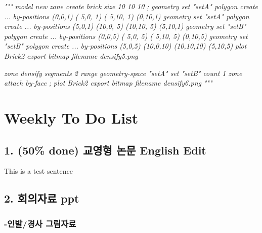 \documentclass[a4paper, nobind]{templates/ociamthesis}
\newenvironment{Shaded}{\begin{snugshade}}{\end{snugshade}}
\newcommand{\CommentTok}[1]{\textcolor[rgb]{0.56,0.35,0.01}{\textit{#1}}}
\renewenvironment{Shaded}
{
  \vspace{10pt}%
  \begin{snugshade}%
}{%
  \end{snugshade}%
  \vspace{8pt}%
}
\begin{document}
\begin{Shaded}
\begin{Highlighting}[]
\CommentTok{"""}
\CommentTok{model new}
\CommentTok{zone create brick size 10 10 10}
\CommentTok{;}
\CommentTok{geometry set "setA" polygon create ...}
\CommentTok{                    by{-}positions (0,0,1) ( 5,0, 1) ( 5,10, 1) (0,10,1)}
\CommentTok{geometry set "setA" polygon create ...}
\CommentTok{                    by{-}positions (5,0,1) (10,0, 5) (10,10, 5) (5,10,1)}
\CommentTok{geometry set "setB" polygon create ...}
\CommentTok{                    by{-}positions (0,0,5) ( 5,0, 5) ( 5,10, 5) (0,10,5)}
\CommentTok{geometry set "setB" polygon create ...}
\CommentTok{                    by{-}positions (5,0,5) (10,0,10) (10,10,10) (5,10,5)}
\CommentTok{plot \textquotesingle{}Brick2\textquotesingle{} export bitmap filename \textquotesingle{}densify5.png\textquotesingle{}}

\CommentTok{zone densify segments 2 range geometry{-}space "setA" set "setB" count 1}
\CommentTok{zone attach by{-}face}
\CommentTok{;}
\CommentTok{plot \textquotesingle{}Brick2\textquotesingle{} export bitmap filename \textquotesingle{}densify6.png\textquotesingle{}}
\CommentTok{"""}
\end{Highlighting}
\end{Shaded}

\newpage

\hypertarget{weekly-to-do-list}{%
\chapter{Weekly To Do List}\label{weekly-to-do-list}}

\hypertarget{done-uxad50uxc601uxd615-uxb17cuxbb38-english-edit}{%
\section{1. (50\% done) 교영형 논문 English Edit}\label{done-uxad50uxc601uxd615-uxb17cuxbb38-english-edit}}

This is a test sentence

\hypertarget{uxd68cuxc758uxc790uxb8cc-ppt}{%
\section{2. 회의자료 ppt}\label{uxd68cuxc758uxc790uxb8cc-ppt}}

\hypertarget{uxc778uxbc1cuxacbduxc0ac-uxadf8uxb9bcuxc790uxb8cc}{%
\subsection{-인발/경사 그림자료}\label{uxc778uxbc1cuxacbduxc0ac-uxadf8uxb9bcuxc790uxb8cc}}
\end{document}
